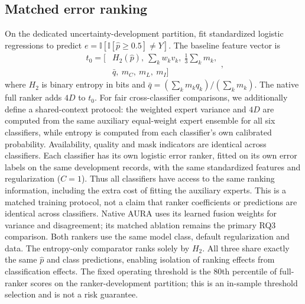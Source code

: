 \documentclass[conference]{IEEEtran}
\begin{document}
\subsection{Matched error ranking}
On the dedicated uncertainty-development partition, fit standardized logistic regressions to predict $e=\mathbb{I}[\mathbb{I}[\hat p\geq0.5]\neq Y]$. The baseline feature vector is
\begin{equation}
 \begin{aligned} t_0=[&H_2(\hat{p}),\ \sum_{k}w_k v_k,\ \tfrac{1}{3}\sum_{k}m_k,\\ &\bar{q},\ m_C,\ m_L,\ m_I] \end{aligned},
\end{equation}
where $H_2$ is binary entropy in bits and $\bar{q}=(\sum_{k}m_kq_k)/(\sum_{k}m_k)$. The native full ranker adds $4D$ to $t_0$. For fair cross-classifier comparisons, we additionally define a shared-context protocol: the weighted expert variance and $4D$ are computed from the same auxiliary equal-weight expert ensemble for all six classifiers, while entropy is computed from each classifier's own calibrated probability. Availability, quality and mask indicators are identical across classifiers. Each classifier has its own logistic error ranker, fitted on its own error labels on the same development records, with the same standardized features and regularization ($C=1$). Thus all classifiers have access to the same ranking information, including the extra cost of fitting the auxiliary experts. This is a matched training protocol, not a claim that ranker coefficients or predictions are identical across classifiers. Native AURA uses its learned fusion weights for variance and disagreement; its matched ablation remains the primary RQ3 comparison. Both rankers use the same model class, default regularization and data. The entropy-only comparator ranks solely by $H_2$. All three share exactly the same $\hat p$ and class predictions, enabling isolation of ranking effects from classification effects. The fixed operating threshold is the 80th percentile of full-ranker scores on the ranker-development partition; this is an in-sample threshold selection and is not a risk guarantee.
\end{document}
